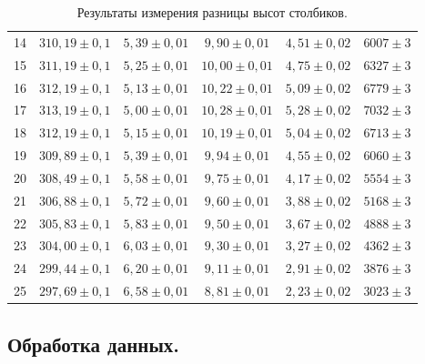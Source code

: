 \documentclass[a4paper,11pt]{article}
\begin{document}
\begin{table}[h!]
\begin{tabular}{ ||c|c|c|c|c|c|| }
  14 & $310,19 \pm 0,1$ & $5,39 \pm 0,01$ & $9,90 \pm 0,01$  & $4,51 \pm 0,02$ & $6007 \pm 3$ \\
  15 & $311,19 \pm 0,1$ & $5,25 \pm 0,01$ & $10,00 \pm 0,01$ & $4,75 \pm 0,02$ & $6327 \pm 3$ \\
  16 & $312,19 \pm 0,1$ & $5,13 \pm 0,01$ & $10,22 \pm 0,01$ & $5,09 \pm 0,02$ & $6779 \pm 3$ \\
  17 & $313,19 \pm 0,1$ & $5,00 \pm 0,01$ & $10,28 \pm 0,01$ & $5,28 \pm 0,02$ & $7032 \pm 3$ \\
  18 & $312,19 \pm 0,1$ & $5,15 \pm 0,01$ & $10,19 \pm 0,01$ & $5,04 \pm 0,02$ & $6713 \pm 3$ \\
  19 & $309,89 \pm 0,1$ & $5,39 \pm 0,01$ & $9,94 \pm 0,01$  & $4,55 \pm 0,02$ & $6060 \pm 3$ \\
  20 & $308,49 \pm 0,1$ & $5,58 \pm 0,01$ & $9,75 \pm 0,01$  & $4,17 \pm 0,02$ & $5554 \pm 3$ \\
  21 & $306,88 \pm 0,1$ & $5,72 \pm 0,01$ & $9,60 \pm 0,01$  & $3,88 \pm 0,02$ & $5168 \pm 3$ \\
  22 & $305,83 \pm 0,1$ & $5,83 \pm 0,01$ & $9,50 \pm 0,01$  & $3,67 \pm 0,02$ & $4888 \pm 3$ \\
  23 & $304,00 \pm 0,1$ & $6,03 \pm 0,01$ & $9,30 \pm 0,01$  & $3,27 \pm 0,02$ & $4362 \pm 3$ \\
  24 & $299,44 \pm 0,1$ & $6,20 \pm 0,01$ & $9,11 \pm 0,01$  & $2,91 \pm 0,02$ & $3876 \pm 3$ \\
  25 & $297,69 \pm 0,1$ & $6,58 \pm 0,01$ & $8,81 \pm 0,01$  & $2,23 \pm 0,02$ & $3023 \pm 3$ \\
  \hline
\end{tabular}
\caption{Результаты измерения разницы высот столбиков.}
\label{table:tab1}
\end{table}
\newpage
\subsection{Обработка данных.}
\end{document}
